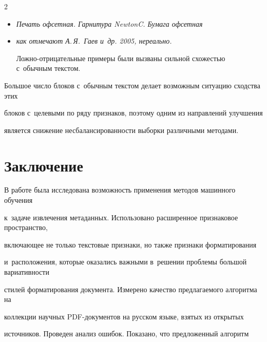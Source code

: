 \begin{multicols}{2}
\begin{itemize}
\item[$\bullet$]


\textit{Печать офсетная. Гарнитура NewtonC. Бумага офсетная}





\item[$\bullet$]


\textit{как отмечают А.\,Я.~Гаев и~др. 2005, нереально.}








Ложно-отрицательные примеры были вызваны сильной схо\-жестью с~обычным текс\-том.


\end{itemize}








Большое число блоков с~обычным текст\-ом делает возможным ситуацию сходства этих 


блоков с~целевыми по ряду признаков, поэтому одним из на\-прав\-ле\-ний улуч\-ше\-ния 


является снижение несбалансированности выборки различными методами.


    


    


\section{Заключение}





В работе была исследована возможность применения методов машинного обучения 


к~задаче извлечения метаданных. Использовано расширенное признаковое про\-стран\-ст\-во, 


вклю\-ча\-ющее не только текс\-то\-вые признаки, но также признаки форматирования 


и~расположения, которые оказались важ\-ны\-ми в~решении проб\-ле\-мы большой вариативности 


стилей форматирования документа. Измерено качество предлагаемого алгоритма на 


коллекции научных PDF-до\-ку\-мен\-тов на рус\-ском языке, взятых из открытых 


источников. Проведен анализ ошибок. Показано, что предложенный алгоритм 



\end{multicols}
